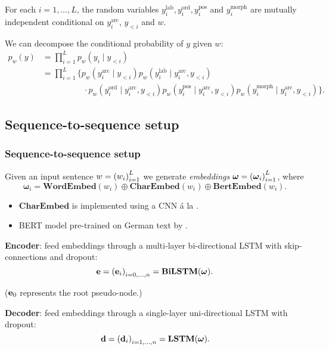 \documentclass[8pt]{beamer}
\theoremstyle{definition}
\theoremstyle{plain}
\theoremstyle{definition}
\theoremstyle{remark}
\numberwithin{equation}{section}
\numberwithin{figure}{section}
\numberwithin{table}{section}
\begin{document}
\begin{frame}
    \begin{assumption}
        For each \(i = 1, \ldots, L\), the random variables \(y_{i}^{\text{lab}}, y_{i}^{\text{ord}}, y_{i}^{\text{pos}}\) and \(y_{i}^{\text{morph}}\) are mutually independent conditional on \(y_{i}^{\text{arc}}\), \(y_{<i}\) and \(w\).
    \end{assumption}
    We can decompose the conditional probability of \(y\) given \(w\): \\[-1.5em]
    \begin{align*}
        p_{w}(y) &= \prod_{i=1}^{L} p_{w}(y_{i} \mid y_{<i}) \\[-0.5em]
        &= \prod_{i=1}^{L} \Big\{ p_{w}(y_{i}^{\text{arc}} \mid y_{<i}) p_{w}(y_{i}^{\text{lab}} \mid y_{i}^{\text{arc}}, y_{<i}) \\[-2.5em]
        & \phantom{\ = \prod_{i=1}^{L} \Big\{} \cdot p_{w}(y_{i}^{\text{ord}} \mid y_{i}^{\text{arc}}, y_{<i}) p_{w}(y_{i}^{\text{pos}} \mid y_{i}^{\text{arc}}, y_{<i}) p_{w}(y_{i}^{\text{morph}} \mid y_{i}^{\text{arc}}, y_{<i}) \Big\}.
    \end{align*}
\end{frame}

\subsection{Sequence-to-sequence setup}
\begin{frame}
    \frametitle{Sequence-to-sequence setup}
    Given an input sentence \(w = \qty(w_{i})_{i=1}^{L}\) we generate \textit{embeddings} \(\boldsymbol{\omega} = \qty(\boldsymbol{\omega}_{i})_{i=1}^{L}\), where
    \[
        \boldsymbol{\omega}_{i} = \mathbf{WordEmbed}(w_{i}) \oplus \mathbf{CharEmbed}(w_{i}) \oplus \mathbf{BertEmbed}(w_{i}).
    \]

    \begin{itemize}
        \item \(\mathbf{CharEmbed}\) is implemented using a CNN á la \textcite{chiu2016named}.
        \item BERT model pre-trained on German text by \textcite{bert-base-german-cased}.
    \end{itemize}

    \textbf{Encoder}: feed embeddings through a multi-layer bi-directional LSTM with skip-connections and dropout:
    \[
        \vb{e} = \qty(\vb{e}_{i})_{i = 0, \ldots, n} = \mathbf{BiLSTM}(\boldsymbol{\omega}).
    \]

    (\(\vb{e}_{0}\) represents the root pseudo-node.)

    \textbf{Decoder}: feed embeddings through a single-layer uni-directional LSTM with dropout:
    \[
        \vb{d} = \qty(\vb{d}_{i})_{i = 1, \ldots, n} = \mathbf{LSTM}(\boldsymbol{\omega}).
    \]

\end{frame}
\end{document}
